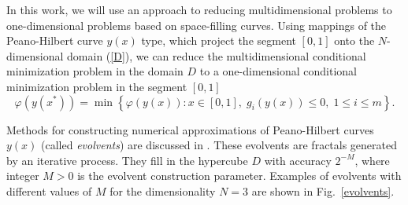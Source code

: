 \documentclass[
11pt,%
tightenlines,%
twoside,%
onecolumn,%
nofloats,%
nobibnotes,%
nofootinbib,%
superscriptaddress,%
noshowpacs,%
centertags]%
{revtex4}
\begin{document}
In this work, we will use an approach to reducing multidimensional problems to one-dimensional problems based on space-filling curves.
Using mappings of the Peano-Hilbert curve $y(x)$ type, which project the segment $[0,1]$ onto the $N$-dimensional domain (\ref{D}),
we can reduce the multidimensional conditional minimization problem in the domain $D$ to a one-dimensional conditional minimization problem in the segment $[0,1]$
\begin{equation}\label{problem1}
\varphi(y(x^\ast))=\min \left\{\varphi(y(x)): x \in [0,1], \; g_i(y(x))\leq 0, \; 1 \leq i \leq m\right\}.
\end{equation}

Methods for constructing numerical approximations of Peano-Hilbert curves $y(x)$ (called \textit{evolvents}) are discussed in \cite{Sergeyev2013}. These evolvents are fractals generated by an iterative process. They fill in the hypercube $D$ with accuracy $2^{-M}$, where integer $M>0$ is the evolvent construction parameter. 
Examples of evolvents with different values of $M$  for the dimensionality $N=3$ are shown in Fig.~\ref{evolvents}.
\end{document}
